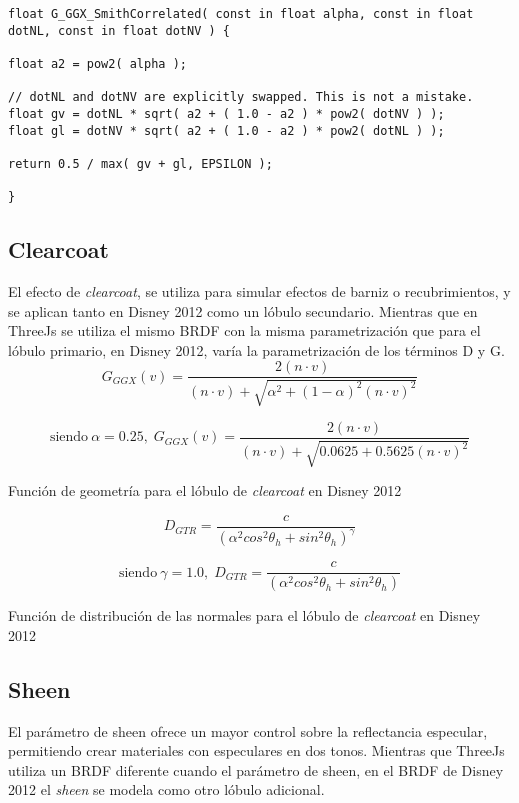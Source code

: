 \begin{lstlisting}[caption=Clase MeshClothMaterial]
float G_GGX_SmithCorrelated( const in float alpha, const in float dotNL, const in float dotNV ) {

float a2 = pow2( alpha );

// dotNL and dotNV are explicitly swapped. This is not a mistake.
float gv = dotNL * sqrt( a2 + ( 1.0 - a2 ) * pow2( dotNV ) );
float gl = dotNV * sqrt( a2 + ( 1.0 - a2 ) * pow2( dotNL ) );

return 0.5 / max( gv + gl, EPSILON );

}
\end{lstlisting}

  \subsection{Clearcoat}
  El efecto de \textit{clearcoat}, se utiliza para simular efectos de barniz o recubrimientos, y se aplican tanto en Disney
  2012 como un l\'obulo secundario. Mientras que en ThreeJs se utiliza el mismo BRDF con la misma parametrizaci\'on que para
  el l\'obulo primario, en Disney 2012, var\'ia la parametrizaci\'on de los t\'erminos D y G.\\

  $$
  G_{GGX}(v) = \frac
  {2 (n \cdot{v})}
  {(n \cdot{v}) + \sqrt{ \alpha^2 + (1 - \alpha)^2 (n \cdot{v})^2 }}
  $$
  \begin{eqfloat}[!htb]
    \begin{equation}
    \textrm{siendo}\ \alpha=0.25,\;
    G_{GGX}(v) = \frac
    {2 (n \cdot{v})}
    {(n \cdot{v}) + \sqrt{ 0.0625 + 0.5625 (n \cdot{v})^2 }}
    \end{equation}
  \caption{Funci\'on de geometr\'ia para el l\'obulo de \textit{clearcoat} en Disney 2012}
  \end{eqfloat}
  \singlespacing

  $$
  D_{GTR} = \frac
  {c}
  {(\alpha^2 cos^2 \theta_h + sin^2 \theta_h)^\gamma}
  $$
  \begin{eqfloat}[!htb]
    \begin{equation}
    \textrm{siendo}\ \gamma=1.0,\;
    D_{GTR} = \frac
    {c}
    {(\alpha^2 cos^2 \theta_h + sin^2 \theta_h)}
    \end{equation}
  \caption{Funci\'on de distribuci\'on de las normales para el l\'obulo de \textit{clearcoat} en Disney 2012}
  \end{eqfloat}
  \singlespacing
  
  \subsection{Sheen}
  El par\'ametro de sheen ofrece un mayor control sobre la reflectancia especular, permitiendo crear materiales con
  especulares en dos tonos. Mientras que ThreeJs utiliza un BRDF diferente cuando el par\'ametro de sheen, en el
  BRDF de Disney 2012 el \textit{sheen} se modela como otro l\'obulo adicional.\\

